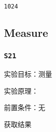 \documentclass[11pt]{article}
\begin{document}
    \begin{Verbatim}[commandchars=\\\{\}]
1024
    \end{Verbatim}

    \subsection{Measure}\label{measure}

    \subsubsection{\texorpdfstring{\texttt{S21}}{S21}}\label{s21}

    实验目标：测量

实验原理：

前置条件：无

获取结果
\end{document}
